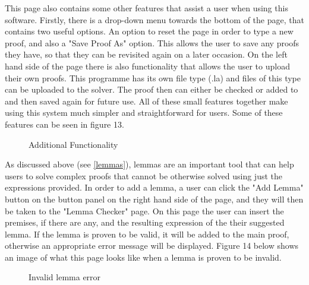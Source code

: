 This page also contains some other features that assist a user when using this software. Firstly, there is a drop-down menu towards the bottom of the page, that contains two useful options. An option to reset the page in order to type a new proof, and also a "Save Proof As" option. This allows the user to save any proofs they have, so that they can be revisited again on a later occasion. On the left hand side of the page there is also functionality that allows the user to upload their own proofs. This programme has its own file type (.la) and files of this type can be uploaded to the solver. The proof then can either be checked or added to and then saved again for future use. All of these small features together make using this system much simpler and straightforward for users. Some of these features can be seen in figure 13.

\begin{figure}[!ht]
	\centering
	\caption{Additional Functionality}
\end{figure}
\pagebreak

As discussed above (see \ref{lemmas}), lemmas are an important tool that can help users to solve complex proofs that cannot be otherwise solved using just the expressions provided. In order to add a lemma, a user can click the "Add Lemma" button on the button panel on the right hand side of the page, and they will then be taken to the "Lemma Checker" page. On this page the user can insert the premises, if there are any, and the resulting expression of the their suggested lemma. If the lemma is proven to be valid, it will be added to the main proof, otherwise an appropriate error message will be displayed. Figure 14 below shows an image of what this page looks like when a lemma is proven to be invalid.

\begin{figure}[!ht]
	\centering
	\caption{Invalid lemma error}
\end{figure}




